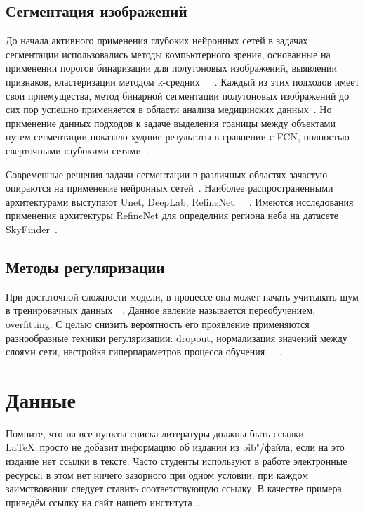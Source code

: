 \subsection{Сегментация изображений}

До начала активного применения глубоких нейронных сетей в задачах сегментации использовались методы компьютерного зрения, основанные на применении порогов бинаризации для полутоновых изображений, выявлении признаков, кластеризации методом k-средних~\autocite{10.5555/1888028.1888043}~\autocite{10.5555/540298}~\autocite{inproceedings}. Каждый из этих подходов имеет свои приемущества, метод бинарной сегментации полутоновых изображений до сих пор успешно применяется в области анализа медицинских данных~\autocite{bookMedicalImages}. Но применение данных подходов к задаче выделения границы между объектами путем сегментации показало худшие результаты в сравнении с FCN, полностью сверточными глубокими сетями~\autocite{7966418}.

Современные решения задачи сегментации в различных областях зачастую опираются на применение нейронных сетей~\autocite{feng2019deep}. Наиболее распространенными архитектурами выступают Unet, DeepLab, RefineNet~\autocite{ronneberger2015unet}~\autocite{chen2016deeplab}~\autocite{lin2016refinenet}. Имеются исследования применения архитектуры RefineNet для определния региона неба на датасете SkyFinder~\autocite{place2017segmenting}.


\subsection{Методы регуляризации}

При достаточной сложности модели, в процессе она может начать учитывать шум в тренировачных данных~\autocite{salman2019overfitting}~\autocite{ghojogh2019theory}. Данное явление называется переобучением, overfitting. С целью снизить вероятность его проявление применяются разнообразные техники регуляризации: dropout, нормализация значений между слоями сети, настройка гиперпараметров процесса обучения~\autocite{smith2018disciplined}~\autocite{labach2019survey}~\autocite{ioffe2015batch}. 

\section{Данные}

\Conc

Помните, что на все пункты списка литературы должны быть ссылки. \LaTeX\ просто не добавит информацию об издании из bib"/файла, если на это издание нет ссылки в тексте. Часто студенты используют в работе  электронные ресурсы: в этом нет ничего зазорного при одном условии: при каждом заимствовании следует ставить соответствующую ссылку. В качестве примера приведём ссылку на сайт нашего института~\autocite{mmcs}.

